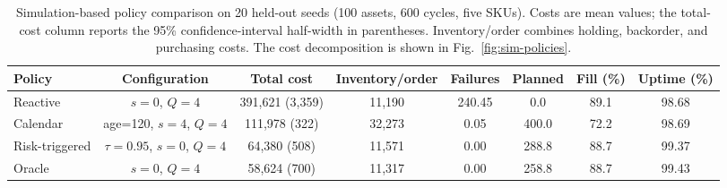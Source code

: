 \begin{table}[H]
\centering
\caption{Simulation-based policy comparison on 20 held-out seeds (100 assets, 600 cycles, five SKUs). Costs are mean values; the total-cost column reports the 95\% confidence-interval half-width in parentheses. Inventory/order combines holding, backorder, and purchasing costs. The cost decomposition is shown in Fig.~\ref{fig:sim-policies}.}
\label{tab:sim-policies}
\footnotesize
\setlength{\tabcolsep}{3pt}
\begin{tabular}{lccccccc}
\toprule
Policy & Configuration & Total cost & Inventory/order & Failures & Planned & Fill (\%) & Uptime (\%) \\
\midrule
Reactive & $s=0$, $Q=4$ & 391,621 (3,359) & 11,190 & 240.45 & 0.0 & 89.1 & 98.68 \\
Calendar & age=120, $s=4$, $Q=4$ & 111,978 (322) & 32,273 & 0.05 & 400.0 & 72.2 & 98.69 \\
Risk-triggered & $\tau=0.95$, $s=0$, $Q=4$ & 64,380 (508) & 11,571 & 0.00 & 288.8 & 88.7 & 99.37 \\
Oracle & $s=0$, $Q=4$ & 58,624 (700) & 11,317 & 0.00 & 258.8 & 88.7 & 99.43 \\
\bottomrule
\end{tabular}
\end{table}
